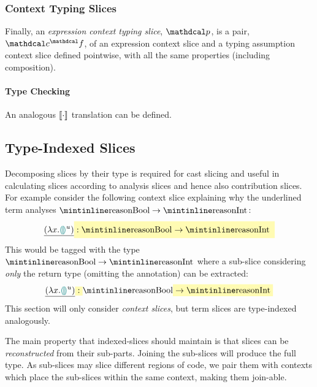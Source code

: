 \subsubsection{Context Typing Slices}
Finally, an \textit{expression context typing slice}, $\p$, is a pair, $\Cs^\f$, of an expression context slice and a typing assumption context slice defined pointwise, with all the same properties (including composition).

\paragraph{Type Checking} An analogous $\llbracket \cdot \rrbracket$ translation can be defined.

\subsection{Type-Indexed Slices}\label{sec:TypeIndexedSlices}
Decomposing slices by their type is required for cast slicing and useful in calculating slices according to analysis slices and hence also contribution slices. For example consider the following context slice explaining why the underlined term analyses $\code{Bool} \to \code{Int}$:
\[\underline{(\lambda x. \hole^u )} \hlcmaths[yellow!30]{:  \code{Bool} \hlcmaths[yellow!30]{\to \code{Int}}}\]
This would be tagged with the type $\code{Bool} \to \code{Int}$ where a sub-slice considering \textit{only} the  return type (omitting the  annotation) can be extracted:
\[\underline{(\lambda x. \hole^u )} \hlcmaths[yellow!30]{:}  \code{Bool} \hlcmaths[yellow!30]{\to \code{Int}}\]
This section will only consider \textit{context slices}, but term slices are type-indexed analogously.

The main property that indexed-slices should maintain is that slices can be \textit{reconstructed} from their sub-parts. Joining the sub-slices will produce the full type. As sub-slices may slice different regions of code, we pair them with contexts which place the sub-slices within the same context, making them join-able.

